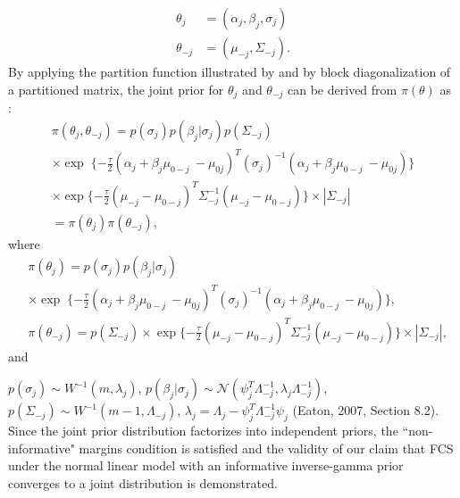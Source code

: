 	\begin{equation}
		\begin{array}{cc}
			\theta_{j}  &= (\alpha_j, \beta_{j}, \sigma_{j})\\
			\theta_{-j} &= (\mu_{-j}, \Sigma_{-j}).
		\end{array}
	\end{equation}
	By applying the partition function illustrated by \citet[p. 165]{Eation2007} and by block diagonalization of a partitioned matrix, the joint prior for $\theta_{j}$ and $\theta_{-j}$ can be derived from $\pi(\theta)$ as :
	\begin{equation}
		\begin{array}{l}
			\pi(\theta_{j}, \theta_{-j}) = p(\sigma_{j})p(\beta_{j}|\sigma_{j})p(\Sigma_{-j})\\
			\times \exp\;\{-\frac{\tau}{2}(\alpha_{j} + \beta_{j}\mu_{0-j}\ - \mu_{0j})^{T}(\sigma_{j})^{-1}(\alpha_{j} + \beta_{j}\mu_{0-j}\ - \mu_{0j})\}\\
			\times \exp\{-\frac{\tau}{2}(\mu_{-j}-\mu_{0-j})^{T}\Sigma_{-j}^{-1}(\mu_{-j}-\mu_{0-j})\} \times |\Sigma_{-j}|\\
			=\pi(\theta_{j})\pi(\theta_{-j}),
		\end{array}
	\end{equation}
	where
	\begin{align}
		&\pi(\theta_{j}) = p(\sigma_{j})p(\beta_{j}|\sigma_{j}) \nonumber\\
		&\times \exp\;\{-\frac{\tau}{2}(\alpha_{j} + \beta_{j}\mu_{0-j}\ - \mu_{0j})^{T}(\sigma_{j})^{-1}(\alpha_{j} + \beta_{j}\mu_{0-j}\ - \mu_{0j})\},\\
		&\pi(\theta_{-j}) = p(\Sigma_{-j})\times \exp\{-\frac{\tau}{2}(\mu_{-j}-\mu_{0-j})^{T}\Sigma_{-j}^{-1}(\mu_{-j}-\mu_{0-j})\} \times |\Sigma_{-j}|,
	\end{align}
	and 
	
	$p(\sigma_{j}) \sim W^{-1}(m, \lambda_j)$, $p(\beta_{j}|\sigma_{j}) \sim \mathcal{N}(\psi_{j}^T\Lambda_{-j}^{-1}, \lambda_j\Lambda_{-j}^{-1})$, $p(\Sigma_{-j}) \sim W^{-1}(m-1, \Lambda_{-j})$, $\lambda_j = \Lambda_{j} - \psi_{j}^T\Lambda_{-j}^{-1}\psi_{j}$ (Eaton, 2007, Section 8.2). Since the joint prior distribution factorizes into independent priors, the ``non-informative" margins condition is satisfied and the validity of our claim that FCS under the normal linear model with an informative inverse-gamma prior converges to a joint distribution is demonstrated. 
	
